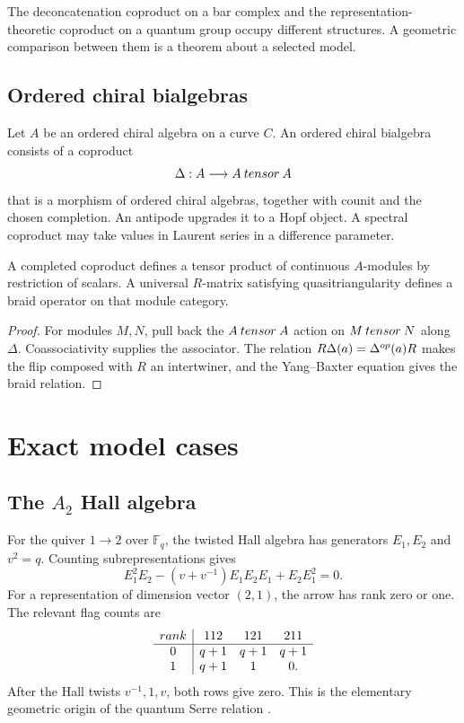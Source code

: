 The deconcatenation coproduct on a bar complex and the representation-theoretic coproduct on a quantum group occupy different structures. A geometric comparison between them is a theorem about a selected model.

\chapter{Ordered chiral bialgebras}
Let $A$ be an ordered chiral algebra on a curve $C$. An ordered chiral bialgebra consists of a coproduct
\[
 \Delta:A\longrightarrow A\mathbin{tensor} A
\]
that is a morphism of ordered chiral algebras, together with counit and the chosen completion. An antipode upgrades it to a Hopf object. A spectral coproduct may take values in Laurent series in a difference parameter.

\begin{theorem}
A completed coproduct defines a tensor product of continuous $A$-modules by restriction of scalars. A universal $R$-matrix satisfying quasitriangularity defines a braid operator on that module category.
\end{theorem}
\begin{proof}
For modules $M,N$, pull back the $A\mathbin{tensor} A$ action on $M\mathbin{tensor} N$ along $\Delta$. Coassociativity supplies the associator. The relation $R\Delta(a)=\Delta^{op}(a)R$ makes the flip composed with $R$ an intertwiner, and the Yang--Baxter equation gives the braid relation.
\end{proof}

\part{Exact model cases}

\chapter{The \texorpdfstring{$A_2$}{A2} Hall algebra}
For the quiver $1\to2$ over $\mathbb F_q$, the twisted Hall algebra has generators $E_1,E_2$ and $v^2=q$. Counting subrepresentations gives
\[
 E_1^2E_2-(v+v^{-1})E_1E_2E_1+E_2E_1^2=0.
\]
For a representation of dimension vector $(2,1)$, the arrow has rank zero or one. The relevant flag counts are
\[
\begin{array}{c|ccc}
rank&112&121&211\\ \hline
0&q+1&q+1&q+1\\
1&q+1&1&0.
\end{array}
\]
After the Hall twists $v^{-1},1,v$, both rows give zero. This is the elementary geometric origin of the quantum Serre relation \cite{Ringel,Green}.

